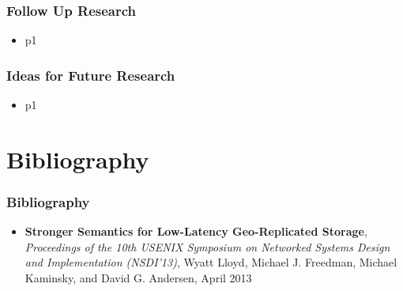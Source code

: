 \documentclass{beamer}
\begin{document}
\begin{frame}
\frametitle{Follow Up Research}
\begin{itemize}
\pause \item p1 
\end{itemize}  
\end{frame}

\begin{frame}
\frametitle{Ideas for Future Research}
\begin{itemize}
\pause \item p1 
\end{itemize}  
\end{frame}



\section{Bibliography} 

\begin{frame}
\frametitle{Bibliography}

\begin{itemize}
\item \textbf{Stronger Semantics for Low-Latency Geo-Replicated Storage}, 
\textit{Proceedings of the 10th USENIX Symposium on Networked Systems Design and Implementation (NSDI’13)}, 
Wyatt Lloyd, Michael J. Freedman, Michael Kaminsky, and David G. Andersen, 
April 2013

\end{itemize}  
\end{frame}
\end{document}
